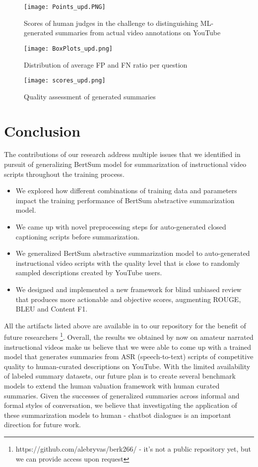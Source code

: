 \documentclass[sigconf]{acmart}
\begin{document}
\begin{figure} 
  \centering
  \texttt{[image: Points\_upd.PNG]}
  \caption{Scores of human judges in the challenge to  distinguishing ML-generated summaries from actual video annotations on YouTube }
  \label{fig:scores}
\end{figure}
\begin{figure} 
  \centering
  \texttt{[image: BoxPlots\_upd.png]}
  \caption{Distribution of average FP and FN ratio per question}
  \label{fig:box}
\end{figure}
\begin{figure} 
  \centering
  \texttt{[image: scores\_upd.png]}
  \caption{Quality assessment of generated summaries}
  \label{fig:quality}
\end{figure} 


\section{Conclusion}

The contributions of our research address multiple issues that we identified in pursuit of generalizing BertSum model for summarization of instructional video scripts throughout the training process. 

\begin{itemize}

\item We explored how different combinations of training data and parameters  impact the training performance  of BertSum abstractive summarization model.
\item We came up with novel preprocessing steps for auto-generated closed captioning scripts before summarization.
\item We generalized BertSum abstractive summarization model to auto-generated instructional video scripts with the quality level that is close to randomly sampled descriptions created by YouTube users.
\item We designed and implemented a new framework for blind unbiased review that produces more actionable and objective scores,  augmenting ROUGE, BLEU and Content F1.
\end{itemize}
 
All the artifacts listed above are available  in to our repository for the benefit of future researchers \footnote{https://github.com/alebryvas/berk266/ - it's not a public repository yet, but we can provide access upon request}. Overall, the results we obtained by now on amateur narrated instructional videos  make us believe that we were able to come up with a trained model  that generates summaries from ASR (speech-to-text) scripts of competitive quality to human-curated descriptions on YouTube. With the limited availability of labeled summary datasets, our future plan is to create several benchmark models to extend the human valuation framework with human curated summaries. Given the successes of generalized summaries across informal and formal styles of conversation, we believe that investigating the application of these summarization models to human - chatbot dialogues is an important direction for future work.
\end{document}
